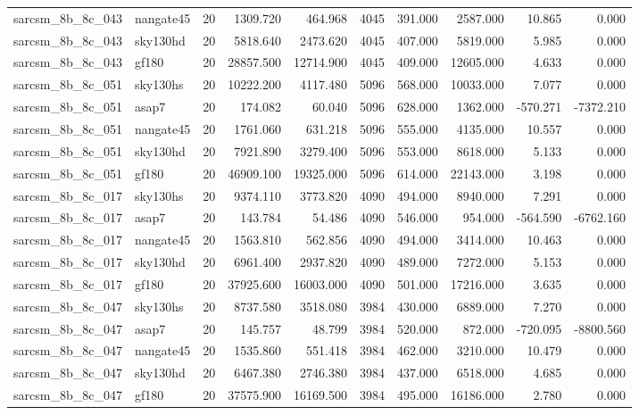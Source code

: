 \begin{tabular}{llrrrrrrrr}
sarcsm\_8b\_8c\_043 & nangate45 & 20 & 1309.720 & 464.968 & 4045 & 391.000 & 2587.000 & 10.865 & 0.000 \\
sarcsm\_8b\_8c\_043 & sky130hd & 20 & 5818.640 & 2473.620 & 4045 & 407.000 & 5819.000 & 5.985 & 0.000 \\
sarcsm\_8b\_8c\_043 & gf180 & 20 & 28857.500 & 12714.900 & 4045 & 409.000 & 12605.000 & 4.633 & 0.000 \\
sarcsm\_8b\_8c\_051 & sky130hs & 20 & 10222.200 & 4117.480 & 5096 & 568.000 & 10033.000 & 7.077 & 0.000 \\
sarcsm\_8b\_8c\_051 & asap7 & 20 & 174.082 & 60.040 & 5096 & 628.000 & 1362.000 & -570.271 & -7372.210 \\
sarcsm\_8b\_8c\_051 & nangate45 & 20 & 1761.060 & 631.218 & 5096 & 555.000 & 4135.000 & 10.557 & 0.000 \\
sarcsm\_8b\_8c\_051 & sky130hd & 20 & 7921.890 & 3279.400 & 5096 & 553.000 & 8618.000 & 5.133 & 0.000 \\
sarcsm\_8b\_8c\_051 & gf180 & 20 & 46909.100 & 19325.000 & 5096 & 614.000 & 22143.000 & 3.198 & 0.000 \\
sarcsm\_8b\_8c\_017 & sky130hs & 20 & 9374.110 & 3773.820 & 4090 & 494.000 & 8940.000 & 7.291 & 0.000 \\
sarcsm\_8b\_8c\_017 & asap7 & 20 & 143.784 & 54.486 & 4090 & 546.000 & 954.000 & -564.590 & -6762.160 \\
sarcsm\_8b\_8c\_017 & nangate45 & 20 & 1563.810 & 562.856 & 4090 & 494.000 & 3414.000 & 10.463 & 0.000 \\
sarcsm\_8b\_8c\_017 & sky130hd & 20 & 6961.400 & 2937.820 & 4090 & 489.000 & 7272.000 & 5.153 & 0.000 \\
sarcsm\_8b\_8c\_017 & gf180 & 20 & 37925.600 & 16003.000 & 4090 & 501.000 & 17216.000 & 3.635 & 0.000 \\
sarcsm\_8b\_8c\_047 & sky130hs & 20 & 8737.580 & 3518.080 & 3984 & 430.000 & 6889.000 & 7.270 & 0.000 \\
sarcsm\_8b\_8c\_047 & asap7 & 20 & 145.757 & 48.799 & 3984 & 520.000 & 872.000 & -720.095 & -8800.560 \\
sarcsm\_8b\_8c\_047 & nangate45 & 20 & 1535.860 & 551.418 & 3984 & 462.000 & 3210.000 & 10.479 & 0.000 \\
sarcsm\_8b\_8c\_047 & sky130hd & 20 & 6467.380 & 2746.380 & 3984 & 437.000 & 6518.000 & 4.685 & 0.000 \\
sarcsm\_8b\_8c\_047 & gf180 & 20 & 37575.900 & 16169.500 & 3984 & 495.000 & 16186.000 & 2.780 & 0.000 \\

\end{tabular}
